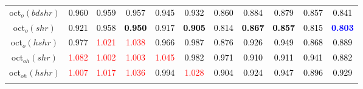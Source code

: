 \begin{tabular}[t]{c|>{}cccc>{}c|ccccc}
oct$_o(bdshr)$ & \textcolor{black}{0.960} & \textcolor{black}{0.959} & \textcolor{black}{0.957} & \textcolor{black}{0.945} & \textcolor{black}{0.932} & \textcolor{black}{0.860} & \textcolor{black}{0.884} & \textcolor{black}{0.879} & \textcolor{black}{0.857} & \textcolor{black}{0.841}\\
oct$_o(shr)$ & \textcolor{black}{0.921} & \textcolor{black}{0.958} & \textcolor{black}{\textbf{0.950}} & \textcolor{black}{0.917} & \textcolor{black}{\textbf{0.905}} & \textcolor{black}{0.814} & \textcolor{black}{\textbf{0.867}} & \textcolor{black}{\textbf{0.857}} & \textcolor{black}{0.815} & \textcolor{blue}{\textbf{0.803}}\\
oct$_o(hshr)$ & \textcolor{black}{0.977} & \textcolor{red}{1.021} & \textcolor{red}{1.038} & \textcolor{black}{0.966} & \textcolor{black}{0.987} & \textcolor{black}{0.876} & \textcolor{black}{0.926} & \textcolor{black}{0.949} & \textcolor{black}{0.868} & \textcolor{black}{0.889}\\
oct$_{oh}(shr)$ & \textcolor{red}{1.082} & \textcolor{red}{1.002} & \textcolor{red}{1.003} & \textcolor{red}{1.045} & \textcolor{black}{0.982} & \textcolor{black}{0.971} & \textcolor{black}{0.910} & \textcolor{black}{0.911} & \textcolor{black}{0.941} & \textcolor{black}{0.882}\\
oct$_{oh}(hshr)$ & \textcolor{red}{1.007} & \textcolor{red}{1.017} & \textcolor{red}{1.036} & \textcolor{black}{0.994} & \textcolor{red}{1.028} & \textcolor{black}{0.904} & \textcolor{black}{0.924} & \textcolor{black}{0.947} & \textcolor{black}{0.896} & \textcolor{black}{0.929}\\
\bottomrule
{}\\
\end{tabular}
